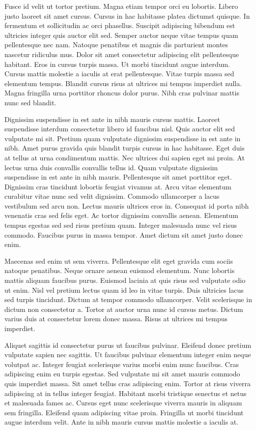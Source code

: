 \documentclass[uplatex, english, twocolumn]{jsarticle}
\begin{document}
Fusce id velit ut tortor pretium. Magna etiam tempor orci eu lobortis. Libero justo laoreet sit amet cursus. Cursus in hac habitasse platea dictumst quisque. In fermentum et sollicitudin ac orci phasellus. Suscipit adipiscing bibendum est ultricies integer quis auctor elit sed. Semper auctor neque vitae tempus quam pellentesque nec nam. Natoque penatibus et magnis dis parturient montes nascetur ridiculus mus. Dolor sit amet consectetur adipiscing elit pellentesque habitant. Eros in cursus turpis massa. Ut morbi tincidunt augue interdum. Cursus mattis molestie a iaculis at erat pellentesque. Vitae turpis massa sed elementum tempus. Blandit cursus risus at ultrices mi tempus imperdiet nulla. Magna fringilla urna porttitor rhoncus dolor purus. Nibh cras pulvinar mattis nunc sed blandit.

Dignissim suspendisse in est ante in nibh mauris cursus mattis. Laoreet suspendisse interdum consectetur libero id faucibus nisl. Quis auctor elit sed vulputate mi sit. Pretium quam vulputate dignissim suspendisse in est ante in nibh. Amet purus gravida quis blandit turpis cursus in hac habitasse. Eget duis at tellus at urna condimentum mattis. Nec ultrices dui sapien eget mi proin. At lectus urna duis convallis convallis tellus id. Quam vulputate dignissim suspendisse in est ante in nibh mauris. Pellentesque sit amet porttitor eget. Dignissim cras tincidunt lobortis feugiat vivamus at. Arcu vitae elementum curabitur vitae nunc sed velit dignissim. Commodo ullamcorper a lacus vestibulum sed arcu non. Lectus mauris ultrices eros in. Consequat id porta nibh venenatis cras sed felis eget. Ac tortor dignissim convallis aenean. Elementum tempus egestas sed sed risus pretium quam. Integer malesuada nunc vel risus commodo. Faucibus purus in massa tempor. Amet dictum sit amet justo donec enim.

Maecenas sed enim ut sem viverra. Pellentesque elit eget gravida cum sociis natoque penatibus. Neque ornare aenean euismod elementum. Nunc lobortis mattis aliquam faucibus purus. Euismod lacinia at quis risus sed vulputate odio ut enim. Nisl vel pretium lectus quam id leo in vitae turpis. Duis ultricies lacus sed turpis tincidunt. Dictum at tempor commodo ullamcorper. Velit scelerisque in dictum non consectetur a. Tortor at auctor urna nunc id cursus metus. Dictum varius duis at consectetur lorem donec massa. Risus at ultrices mi tempus imperdiet.

Aliquet sagittis id consectetur purus ut faucibus pulvinar. Eleifend donec pretium vulputate sapien nec sagittis. Ut faucibus pulvinar elementum integer enim neque volutpat ac. Integer feugiat scelerisque varius morbi enim nunc faucibus. Cras adipiscing enim eu turpis egestas. Sed vulputate mi sit amet mauris commodo quis imperdiet massa. Sit amet tellus cras adipiscing enim. Tortor at risus viverra adipiscing at in tellus integer feugiat. Habitant morbi tristique senectus et netus et malesuada fames ac. Cursus eget nunc scelerisque viverra mauris in aliquam sem fringilla. Eleifend quam adipiscing vitae proin. Fringilla ut morbi tincidunt augue interdum velit. Ante in nibh mauris cursus mattis molestie a iaculis at.
\end{document}
